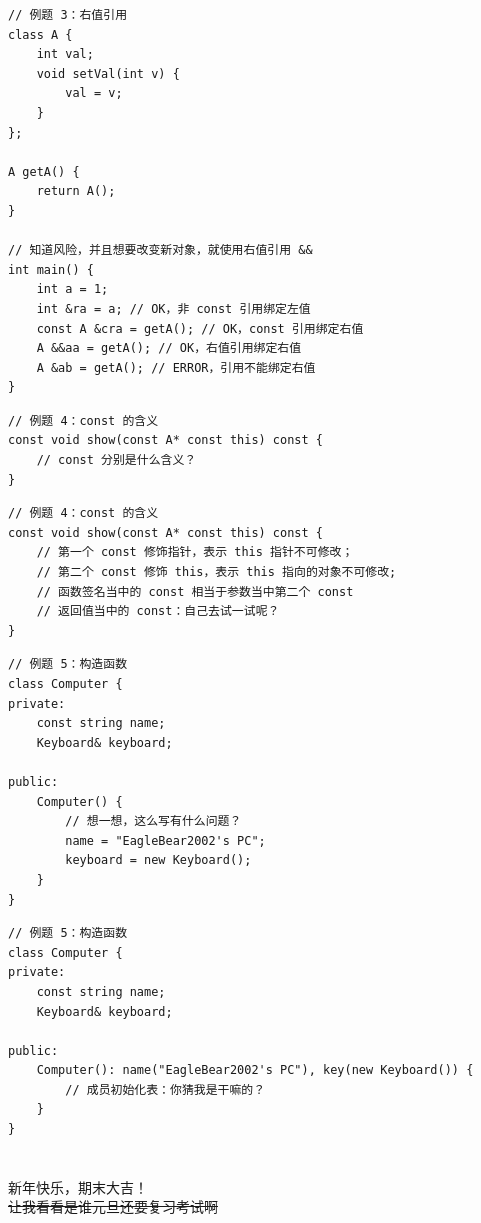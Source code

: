 \documentclass[10pt,aspectratio=169,mathserif]{beamer}
\begin{document}
\begin{frame}[fragile]
    \begin{lstlisting}
// 例题 3：右值引用
class A {
    int val;
    void setVal(int v) {
        val = v;
    }
};

A getA() {
    return A();
}

// 知道风险，并且想要改变新对象，就使用右值引用 &&
int main() {
    int a = 1;
    int &ra = a; // OK，非 const 引用绑定左值
    const A &cra = getA(); // OK，const 引用绑定右值
    A &&aa = getA(); // OK，右值引用绑定右值
    A &ab = getA(); // ERROR，引用不能绑定右值
}
    \end{lstlisting}
\end{frame}

\begin{frame}[fragile]
    \begin{lstlisting}
// 例题 4：const 的含义
const void show(const A* const this) const {
    // const 分别是什么含义？
}
    \end{lstlisting}
\end{frame}

\begin{frame}[fragile]
    \begin{lstlisting}
// 例题 4：const 的含义
const void show(const A* const this) const {
    // 第一个 const 修饰指针，表示 this 指针不可修改；
    // 第二个 const 修饰 this，表示 this 指向的对象不可修改;
    // 函数签名当中的 const 相当于参数当中第二个 const
    // 返回值当中的 const：自己去试一试呢？
}
    \end{lstlisting}
\end{frame}

\begin{frame}[fragile]
    \begin{lstlisting}
// 例题 5：构造函数
class Computer {
private:
    const string name;
    Keyboard& keyboard;

public:
    Computer() {
        // 想一想，这么写有什么问题？
        name = "EagleBear2002's PC";
        keyboard = new Keyboard();
    }
}
    \end{lstlisting}
\end{frame}

\begin{frame}[fragile]
    \begin{lstlisting}
// 例题 5：构造函数
class Computer {
private:
    const string name;
    Keyboard& keyboard;

public:
    Computer(): name("EagleBear2002's PC"), key(new Keyboard()) {
        // 成员初始化表：你猜我是干嘛的？
    }
}
    \end{lstlisting}
\end{frame}

\section{}
\begin{frame}[fragile]
    \vfill
    \centering
    \Large 新年快乐，期末大吉！\\
    \sout{让我看看是谁元旦还要复习考试啊}
    \vfill
\end{frame}
\end{document}
